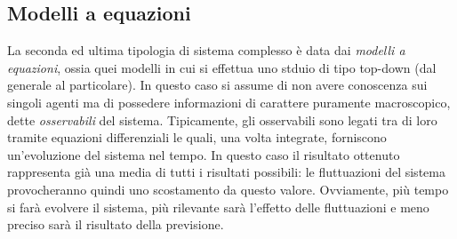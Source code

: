 \documentclass[12pt, a4paper]{book}
\theoremstyle{theorem}
\begin{document}
			\subsection{Modelli a equazioni}
				La seconda ed ultima tipologia di sistema complesso è data dai \emph{modelli a equazioni}, ossia quei modelli in cui si effettua uno stduio di tipo top-down (dal generale al particolare).
				In questo caso si assume di non avere conoscenza sui singoli agenti ma di possedere informazioni di carattere puramente macroscopico, dette \emph{osservabili} del sistema.
				Tipicamente, gli osservabili sono legati tra di loro tramite equazioni differenziali le quali, una volta integrate, forniscono un'evoluzione del sistema nel tempo.
				In questo caso il risultato ottenuto rappresenta già una media di tutti i risultati possibili: le fluttuazioni del sistema provocheranno quindi uno scostamento da questo valore.
				Ovviamente, più tempo si farà evolvere il sistema, più rilevante sarà l'effetto delle fluttuazioni e meno preciso sarà il risultato della previsione.
\end{document}

